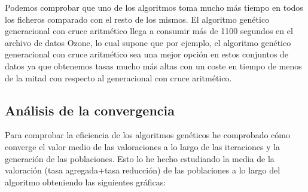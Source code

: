 \documentclass[12pt,a4paper]{article}
\begin{document}
	Podemos comprobar que uno de los algoritmos toma mucho más tiempo en todos los ficheros comparado con el resto de los mismos. El algoritmo genético generacional con cruce aritmético llega a consumir más de 1100 segundos en el archivo de datos Ozone, lo cual supone que por ejemplo, el algoritmo genético generacional con cruce aritmético sea una mejor opción en estos conjuntos de datos ya que obtenemos tasas mucho más altas con un coste en tiempo de menos de la mitad con respecto al generacional con cruce aritmético.
	
	\newpage
	
	\subsection{Análisis de la convergencia}
	
	Para comprobar la eficiencia de los algoritmos genéticos he comprobado cómo converge el valor medio de las valoraciones a lo largo de las iteraciones y la generación de las poblaciones. Esto lo he hecho estudiando la media de la valoración (tasa agregada+tasa reducción) de las poblaciones a lo largo del algoritmo obteniendo las siguientes gráficas:
	
\end{document}
